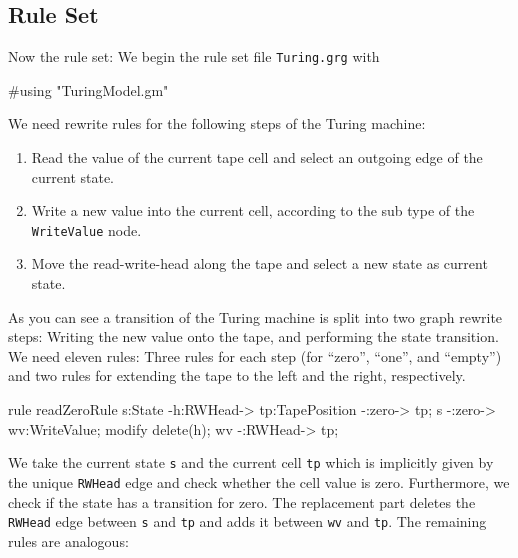 \subsection{Rule Set}
Now the rule set: We begin the rule set file \texttt{Turing.grg} with

\begin{grgen}[firstnumber=1]
#using "TuringModel.gm"

\end{grgen}
We need rewrite rules for the following steps of the Turing machine:
\begin{enumerate}
  \item Read the value of the current tape cell and select an outgoing edge of the current state.
  \item Write a new value into the current cell, according to the sub type of the \texttt{WriteValue} node.
  \item Move the read-write-head along the tape and select a new state as current state.
\end{enumerate}
As you can see a transition of the Turing machine is split into two graph rewrite steps:
Writing the new value onto the tape, and performing the state transition.
We need eleven rules: Three rules for each step (for ``zero'', ``one'', and ``empty'') and two rules for extending the tape to the left and the right, respectively.
\begin{grgen}[firstnumber=last]
rule readZeroRule {
	s:State -h:RWHead-> tp:TapePosition -:zero-> tp;
	s -:zero-> wv:WriteValue;
	modify {
		delete(h);
		wv -:RWHead-> tp;
	}
}
\end{grgen}

\vspace{5mm}

We take the current state \texttt{s} and the current cell \texttt{tp} which is implicitly given by the unique \texttt{RWHead} edge and check whether the cell value is zero.
Furthermore, we check if the state has a transition for zero. 
The replacement part deletes the \texttt{RWHead} edge between \texttt{s} and \texttt{tp} and adds it between \texttt{wv} and \texttt{tp}. 
The remaining rules are analogous:

\vspace{5mm}


